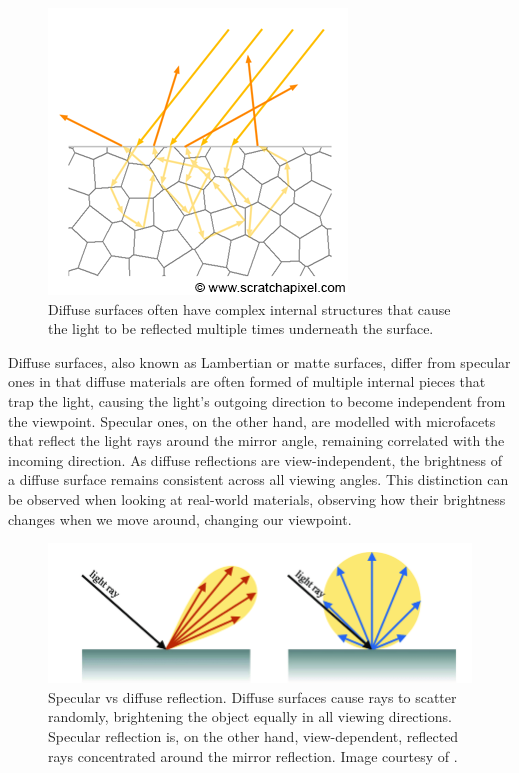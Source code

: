 \begin{figure}
  \centering
   \includegraphics[width=0.5\linewidth]{Images/shad-diffuse1.png}
   \caption{Diffuse surfaces often have complex internal structures that cause the light to be reflected multiple times underneath the surface.}
   \label{fig:diffuse-scattering}
\end{figure}

Diffuse surfaces, also known as Lambertian or matte surfaces, differ from specular ones in that diffuse materials are often formed of multiple internal pieces that trap the light, causing the light's outgoing direction to become independent from the viewpoint. Specular ones, on the other hand, are modelled with microfacets that reflect the light rays around the mirror angle, remaining correlated with the incoming direction. As diffuse reflections are view-independent, the brightness of a diffuse surface remains consistent across all viewing angles. This distinction can be observed when looking at real-world materials, observing how their brightness changes when we move around, changing our viewpoint.


\begin{figure}[h]
  \centering
   \includegraphics[width=0.7\linewidth]{Images/Differences-between-the-specular-and-diffuse-reflections-specuclar-reflections-occur-on.png}
   \caption{Specular vs diffuse reflection. Diffuse surfaces cause rays to scatter randomly, brightening the object equally in all viewing directions. Specular reflection is, on the other hand, view-dependent, reflected rays concentrated around the mirror reflection. Image courtesy of \citeauthor{specfig}.}
   \label{fig:specularvsdiffuse}
\end{figure}

